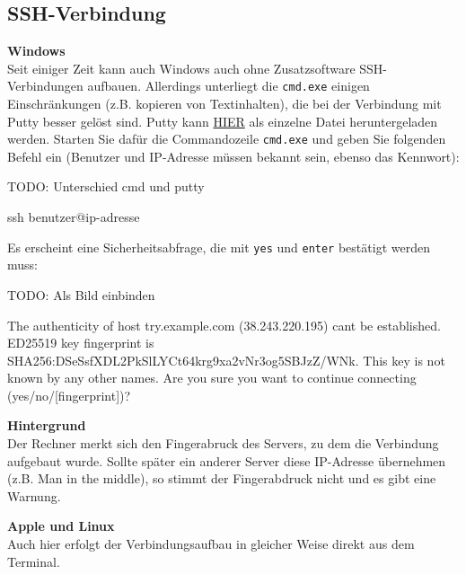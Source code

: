 \documentclass[
  letterpaper,
  DIV=11]{scrreprt}
\newenvironment{Shaded}{\begin{snugshade}}{\end{snugshade}}
\newcommand{\ExtensionTok}[1]{\textcolor[rgb]{0.00,0.23,0.31}{#1}}
\newcommand{\FunctionTok}[1]{\textcolor[rgb]{0.28,0.35,0.67}{#1}}
\newcommand{\NormalTok}[1]{\textcolor[rgb]{0.00,0.23,0.31}{#1}}
\newcommand{\StringTok}[1]{\textcolor[rgb]{0.13,0.47,0.30}{#1}}
\begin{document}
\subsection{SSH-Verbindung}\label{ssh-verbindung}

\textbf{Windows}\\
Seit einiger Zeit kann auch Windows auch ohne Zusatzsoftware
SSH-Verbindungen aufbauen. Allerdings unterliegt die \texttt{cmd.exe}
einigen Einschränkungen (z.B. kopieren von Textinhalten), die bei der
Verbindung mit Putty besser gelöst sind. Putty kann \href{TODO}{HIER}
als einzelne Datei heruntergeladen werden. Starten Sie dafür die
Commandozeile \texttt{cmd.exe} und geben Sie folgenden Befehl ein
(Benutzer und IP-Adresse müssen bekannt sein, ebenso das Kennwort):

TODO: Unterschied cmd und putty

\begin{Shaded}
\begin{Highlighting}[]
\FunctionTok{ssh}\NormalTok{ benutzer@ip{-}adresse }
\end{Highlighting}
\end{Shaded}

Es erscheint eine Sicherheitsabfrage, die mit \texttt{yes} und
\texttt{enter} bestätigt werden muss:

TODO: Als Bild einbinden

\begin{Shaded}
\begin{Highlighting}[]
\ExtensionTok{The}\NormalTok{ authenticity of host }\StringTok{\textquotesingle{}try.example.com (38.243.220.195)\textquotesingle{}}\NormalTok{ can}\StringTok{\textquotesingle{}t be established.}
\StringTok{ED25519 key fingerprint is SHA256:DSeSsfXDL2PkSlLYCt64krg9xa2vNr3og5SBJzZ/WNk.}
\StringTok{This key is not known by any other names.}
\StringTok{Are you sure you want to continue connecting (yes/no/[fingerprint])?}
\end{Highlighting}
\end{Shaded}

\samplestart

\textbf{Hintergrund}\\
Der Rechner merkt sich den Fingerabruck des Servers, zu dem die
Verbindung aufgebaut wurde. Sollte später ein anderer Server diese
IP-Adresse übernehmen (z.B. Man in the middle), so stimmt der
Fingerabdruck nicht und es gibt eine Warnung. \sampleend

\textbf{Apple und Linux}\\
Auch hier erfolgt der Verbindungsaufbau in gleicher Weise direkt aus dem
Terminal.
\end{document}
